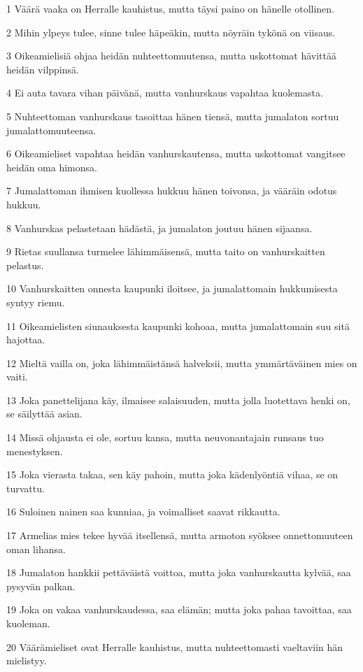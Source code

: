 \par 1 Väärä vaaka on Herralle kauhistus, mutta täysi paino on hänelle otollinen.
\par 2 Mihin ylpeys tulee, sinne tulee häpeäkin, mutta nöyräin tykönä on viisaus.
\par 3 Oikeamielisiä ohjaa heidän nuhteettomuutensa, mutta uskottomat hävittää heidän vilppinsä.
\par 4 Ei auta tavara vihan päivänä, mutta vanhurskaus vapahtaa kuolemasta.
\par 5 Nuhteettoman vanhurskaus tasoittaa hänen tiensä, mutta jumalaton sortuu jumalattomuuteensa.
\par 6 Oikeamieliset vapahtaa heidän vanhurskautensa, mutta uskottomat vangitsee heidän oma himonsa.
\par 7 Jumalattoman ihmisen kuollessa hukkuu hänen toivonsa, ja vääräin odotus hukkuu.
\par 8 Vanhurskas pelastetaan hädästä, ja jumalaton joutuu hänen sijaansa.
\par 9 Rietas suullansa turmelee lähimmäisensä, mutta taito on vanhurskaitten pelastus.
\par 10 Vanhurskaitten onnesta kaupunki iloitsee, ja jumalattomain hukkumisesta syntyy riemu.
\par 11 Oikeamielisten siunauksesta kaupunki kohoaa, mutta jumalattomain suu sitä hajottaa.
\par 12 Mieltä vailla on, joka lähimmäistänsä halveksii, mutta ymmärtäväinen mies on vaiti.
\par 13 Joka panettelijana käy, ilmaisee salaisuuden, mutta jolla luotettava henki on, se säilyttää asian.
\par 14 Missä ohjausta ei ole, sortuu kansa, mutta neuvonantajain runsaus tuo menestyksen.
\par 15 Joka vierasta takaa, sen käy pahoin, mutta joka kädenlyöntiä vihaa, se on turvattu.
\par 16 Suloinen nainen saa kunniaa, ja voimalliset saavat rikkautta.
\par 17 Armelias mies tekee hyvää itsellensä, mutta armoton syöksee onnettomuuteen oman lihansa.
\par 18 Jumalaton hankkii pettäväistä voittoa, mutta joka vanhurskautta kylvää, saa pysyvän palkan.
\par 19 Joka on vakaa vanhurskaudessa, saa elämän; mutta joka pahaa tavoittaa, saa kuoleman.
\par 20 Väärämieliset ovat Herralle kauhistus, mutta nuhteettomasti vaeltaviin hän mielistyy.
